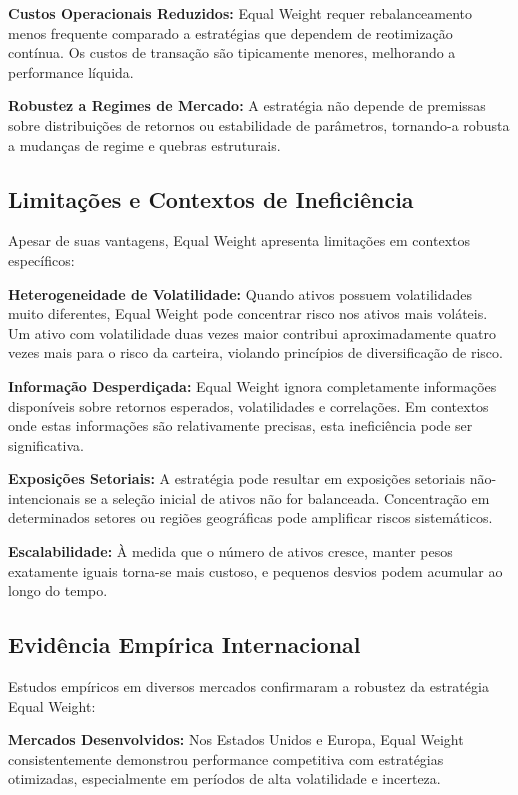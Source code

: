 \textbf{Custos Operacionais Reduzidos:} Equal Weight requer rebalanceamento menos frequente comparado a estratégias que dependem de reotimização contínua. Os custos de transação são tipicamente menores, melhorando a performance líquida.

\textbf{Robustez a Regimes de Mercado:} A estratégia não depende de premissas sobre distribuições de retornos ou estabilidade de parâmetros, tornando-a robusta a mudanças de regime e quebras estruturais.

\subsection{Limitações e Contextos de Ineficiência}

Apesar de suas vantagens, Equal Weight apresenta limitações em contextos específicos:

\textbf{Heterogeneidade de Volatilidade:} Quando ativos possuem volatilidades muito diferentes, Equal Weight pode concentrar risco nos ativos mais voláteis. Um ativo com volatilidade duas vezes maior contribui aproximadamente quatro vezes mais para o risco da carteira, violando princípios de diversificação de risco.

\textbf{Informação Desperdiçada:} Equal Weight ignora completamente informações disponíveis sobre retornos esperados, volatilidades e correlações. Em contextos onde estas informações são relativamente precisas, esta ineficiência pode ser significativa.

\textbf{Exposições Setoriais:} A estratégia pode resultar em exposições setoriais não-intencionais se a seleção inicial de ativos não for balanceada. Concentração em determinados setores ou regiões geográficas pode amplificar riscos sistemáticos.

\textbf{Escalabilidade:} À medida que o número de ativos cresce, manter pesos exatamente iguais torna-se mais custoso, e pequenos desvios podem acumular ao longo do tempo.

\subsection{Evidência Empírica Internacional}

Estudos empíricos em diversos mercados confirmaram a robustez da estratégia Equal Weight:

\textbf{Mercados Desenvolvidos:} Nos Estados Unidos e Europa, Equal Weight consistentemente demonstrou performance competitiva com estratégias otimizadas, especialmente em períodos de alta volatilidade e incerteza.

